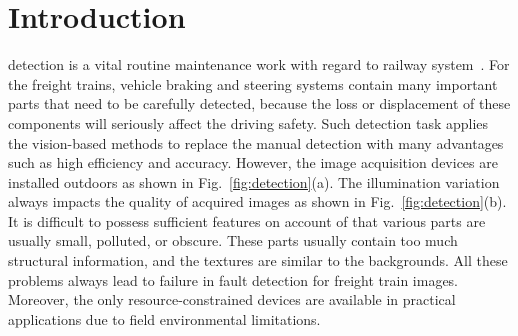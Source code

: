 \section{Introduction}
\label{intro}
 detection is a vital routine maintenance work with regard to railway system~\cite{8673908,8692707,8667891}. For the freight trains, vehicle braking and steering systems contain many important parts that need to be carefully detected, because the loss or displacement of these components will seriously affect the driving safety. Such detection task applies the vision-based methods to replace the manual detection with many advantages such as high efficiency and accuracy. However, the image acquisition devices are installed outdoors as shown in Fig.~\ref{fig:detection}(a). The illumination variation always impacts the quality of acquired images as shown in Fig.~\ref{fig:detection}(b). It is difficult to possess sufficient features on account of that various parts are usually small, polluted, or obscure. These parts usually contain too much structural information, and the textures are similar to the backgrounds. All these problems always lead to failure in fault detection for freight train images. Moreover, the only resource-constrained devices are available in practical applications due to field environmental limitations.

